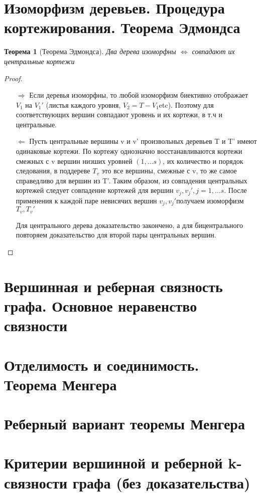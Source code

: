 \documentclass[a4paper]{article}
\newtheorem{theorem}{Теорема}[section]
\theoremstyle{definition}
\theoremstyle{remark}
\begin{document}
\begin{multicols*}{2}
    \section{Изоморфизм деревьев. Процедура кортежирования. Теорема Эдмондса}
    \begin{theorem}[Теорема Эдмондса]
        Два дерева изоморфны $\Leftrightarrow$ совпадают их центральные кортежи
    \end{theorem}
    \begin{proof}
        \begin{itemize}
            \item[$\Rightarrow$] Если деревья изоморфны, то любой изоморфизм биективно отображает $V_1$ на $V_1'$ (листья каждого уровня,
            $V_2 = T - V_1 $etc). Поэтому для соответствующих вершин совпадают уровень и их кортежи, в т.ч и центральные.
            \item[$\Leftarrow$] Пусть центральные вершины v и v' произвольных деревьев T и T'
            имеют одинаковые кортежи. По кортежу однозначно восстанавливаются кортежи смежных с v вершин
            низших уровней $(1, \dots s)$, их количество и порядок следования, в поддереве $T_v$ это
            все вершины, смежные с v, то же самое справедливо для вершин из T'. Таким образом,
            из совпадения центральных кортежей следует совпадение кортежей для вершин $v_j, v_j', j = 1, \dots s$.
            После применения к каждой паре невисячих вершин $v_j, v_j'$получаем изоморфизм $T_v, T_v'$

            Для центрального дерева доказательство закончено, а для бицентрального повторяем доказательство для второй пары центральных
            вершин. 
        \end{itemize}
    \end{proof}
    \section{Вершинная и реберная связность графа. Основное неравенство связности}
    \section{Отделимость и соединимость. Теорема Менгера}
    \section{Реберный вариант теоремы Менгера}
    \section{Критерии вершинной и реберной k-связности графа (без доказательства)}

\end{multicols*}
\end{document}
